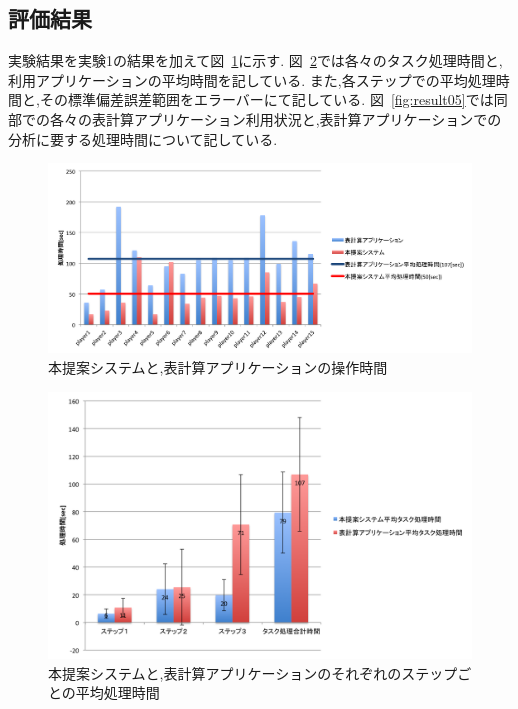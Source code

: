 \documentclass[sotsuron]{kuee}
\begin{document}
		\subsection{評価結果}
			実験結果を実験1の結果を加えて図~\ref{fig:result03}に示す.
			図~\ref{fig:result04}では各々のタスク処理時間と,利用アプリケーションの平均時間を記している.
			また,各ステップでの平均処理時間と,その標準偏差誤差範囲をエラーバーにて記している.
			図~\ref{fig:result05}では同部での各々の表計算アプリケーション利用状況と,表計算アプリケーションでの分析に要する処理時間について記している.
			\begin{figure}
				\begin{center}
					\includegraphics[width=\linewidth]{./png/result03.png}
				\end{center}
				\caption{本提案システムと,表計算アプリケーションの操作時間}
		  		\label{fig:result03}
			\end{figure}
			\begin{figure}
				\begin{center}
					\includegraphics[width=\linewidth]{./png/result04.png}
				\end{center}
				\caption{本提案システムと,表計算アプリケーションのそれぞれのステップごとの平均処理時間}
		  		\label{fig:result04}
			\end{figure}
\end{document}
